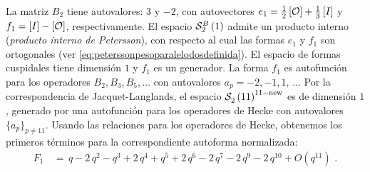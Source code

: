 La matriz $B_{2}$ tiene autovalores: $3$ y $-2$, con autovectores
$e_1=\frac{1}{2}\,[\cal{O}]+\frac{1}{3}\,[I]$ y $f_1=[I]-[\cal{O}]$,
respectivamente. El espacio $\spitz[B]{2}{1}$ admite un producto interno
(\emph{producto interno de Petersson}), con respecto al cual las formas $e_1$ y
$f_1$ son ortogonales (ver \eqref{eq:peterssonpesoparalelodosdefinida}).
% 
% 
El espacio de formas cuspidales tiene dimensi\'{o}n $1$ y $f_1$ es un
generador. La forma $f_1$ es autofunci\'{o}n para los operadores
$B_{2},B_{3},B_{5},\dots$ con autovalores $a_p=-2,-1,1,\,\dots$
Por la correspondencia de Jacquet-Langlands, el espacio
$\spitz{2}{11}^{11-\neue}$ es de dimensi\'{o}n $1$, generado por una
autofunci\'{o}n para los operadores de Hecke con autovalores
$\{a_p\}_{p\not=11}$. Usando las relaciones para los operadores de Hecke,
obtenemos los primeros t\'{e}rminos para la correspondiente autoforma
normalizada:
\begin{align*}
	F_1 & \,=\,q-2\,q^2-q^3+2\,q^4+q^5+2\,q^6-2\,q^7
		-2\,q^9-2\,q^{10} + O(q^{11})
	\text{ .}
\end{align*}
%
% 
